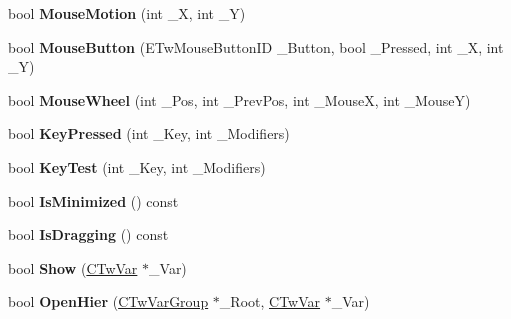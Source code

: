 \begin{DoxyCompactItemize}
\item 
\hypertarget{struct_c_tw_bar_a5b70fee003c6a68a209a7b4cb37f4177}{bool {\bfseries Mouse\+Motion} (int \+\_\+\+X, int \+\_\+\+Y)}\label{struct_c_tw_bar_a5b70fee003c6a68a209a7b4cb37f4177}

\item 
\hypertarget{struct_c_tw_bar_a42f44b33bd75d80986d5e555b7f0fea2}{bool {\bfseries Mouse\+Button} (E\+Tw\+Mouse\+Button\+I\+D \+\_\+\+Button, bool \+\_\+\+Pressed, int \+\_\+\+X, int \+\_\+\+Y)}\label{struct_c_tw_bar_a42f44b33bd75d80986d5e555b7f0fea2}

\item 
\hypertarget{struct_c_tw_bar_ad50ba664dcc63ad3aefc42c62bec0b1c}{bool {\bfseries Mouse\+Wheel} (int \+\_\+\+Pos, int \+\_\+\+Prev\+Pos, int \+\_\+\+Mouse\+X, int \+\_\+\+Mouse\+Y)}\label{struct_c_tw_bar_ad50ba664dcc63ad3aefc42c62bec0b1c}

\item 
\hypertarget{struct_c_tw_bar_a36aa7dca693d705fb936b29bbc3031f9}{bool {\bfseries Key\+Pressed} (int \+\_\+\+Key, int \+\_\+\+Modifiers)}\label{struct_c_tw_bar_a36aa7dca693d705fb936b29bbc3031f9}

\item 
\hypertarget{struct_c_tw_bar_aa2e8f8b968ba5508dab272728a03a63d}{bool {\bfseries Key\+Test} (int \+\_\+\+Key, int \+\_\+\+Modifiers)}\label{struct_c_tw_bar_aa2e8f8b968ba5508dab272728a03a63d}

\item 
\hypertarget{struct_c_tw_bar_a60bd42b5bb0005ad540d34fe2375f803}{bool {\bfseries Is\+Minimized} () const }\label{struct_c_tw_bar_a60bd42b5bb0005ad540d34fe2375f803}

\item 
\hypertarget{struct_c_tw_bar_ac64aaed5df993209b449df2928c137c5}{bool {\bfseries Is\+Dragging} () const }\label{struct_c_tw_bar_ac64aaed5df993209b449df2928c137c5}

\item 
\hypertarget{struct_c_tw_bar_a8efb8126621c6111d7d65bec5fc0d592}{bool {\bfseries Show} (\hyperlink{struct_c_tw_var}{C\+Tw\+Var} $\ast$\+\_\+\+Var)}\label{struct_c_tw_bar_a8efb8126621c6111d7d65bec5fc0d592}

\item 
\hypertarget{struct_c_tw_bar_ad293ce5c4ed61fe2eff7dcb184e2f9ff}{bool {\bfseries Open\+Hier} (\hyperlink{struct_c_tw_var_group}{C\+Tw\+Var\+Group} $\ast$\+\_\+\+Root, \hyperlink{struct_c_tw_var}{C\+Tw\+Var} $\ast$\+\_\+\+Var)}\label{struct_c_tw_bar_ad293ce5c4ed61fe2eff7dcb184e2f9ff}


\end{DoxyCompactItemize}
